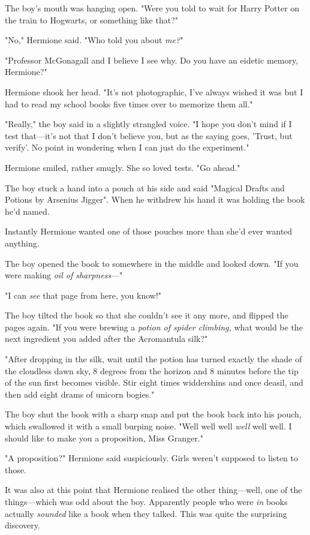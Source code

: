 The boy's mouth was hanging open. "Were you told to wait for Harry Potter on 
the train to Hogwarts, or something like that?"

"No," Hermione said. "Who told you about \emph{me?}"

"Professor McGonagall and I believe I see why. Do you have an eidetic memory, 
Hermione?"

Hermione shook her head. "It's not photographic, I've always wished it was but 
I had to read my school books five times over to memorize them all."

"Really," the boy said in a slightly strangled voice. "I hope you don't mind if 
I test that---it's not that I don't believe you, but as the saying goes, 
'Trust, but verify'. No point in wondering when I can just do the experiment."

Hermione smiled, rather smugly. She so loved tests. "Go ahead."

The boy stuck a hand into a pouch at his side and said "Magical Drafts and 
Potions by Arsenius Jigger". When he withdrew his hand it was holding the book 
he'd named.

Instantly Hermione wanted one of those pouches more than she'd ever wanted 
anything.

The boy opened the book to somewhere in the middle and looked down. "If you 
were making \emph{oil of sharpness}---"

"I can \emph{see} that page from here, you know!"

The boy tilted the book so that she couldn't see it any more, and flipped the 
pages again. "If you were brewing a \emph{potion of spider climbing,} what 
would be the next ingredient you added after the Acromantula silk?"

"After dropping in the silk, wait until the potion has turned exactly the shade 
of the cloudless dawn sky, 8 degrees from the horizon and 8 minutes before the 
tip of the sun first becomes visible. Stir eight times widdershins and once 
deasil, and then add eight drams of unicorn bogies."

The boy shut the book with a sharp snap and put the book back into his pouch, 
which swallowed it with a small burping noise. "Well well well \emph{well} well 
well. I should like to make you a proposition, Miss Granger."

"A proposition?" Hermione said suspiciously. Girls weren't supposed to listen 
to those.

It was also at this point that Hermione realised the other thing---well, one of 
the things---which was odd about the boy. Apparently people who were \emph{in} 
books actually \emph{sounded} like a book when they talked. This was quite the 
surprising discovery.

